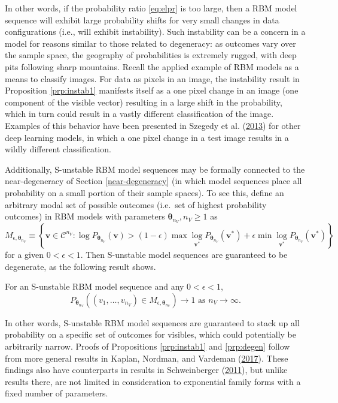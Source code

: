 \documentclass[]{article}
\theoremstyle{definition}
\newcommand{\nv}{{n_{\scriptscriptstyle V}}}
\let\BeginKnitrBlock\begin \let\EndKnitrBlock\end
\begin{document}
In other words, if the probability ratio \eqref{eq:elpr} is too large,
then a RBM model sequence will exhibit large probability shifts for very
small changes in data configurations (i.e., will exhibit instability).
Such instability can be a concern in a model for reasons similar to
those related to degeneracy: as outcomes vary over the sample space, the
geography of probabilities is extremely rugged, with deep pits following
sharp mountains. Recall the applied example of RBM models as a means to
classify images. For data as pixels in an image, the instability result
in Proposition \ref{prp:instab1} manifests itself as a one pixel change
in an image (one component of the visible vector) resulting in a large
shift in the probability, which in turn could result in a vastly
different classification of the image. Examples of this behavior have
been presented in Szegedy et al.
(\protect\hyperlink{ref-szegedy2013intriguing}{2013}) for other deep
learning models, in which a one pixel change in a test image results in
a wildly different classification.

Additionally, S-unstable RBM model sequences may be formally connected
to the near-degeneracy of Section \ref{near-degeneracy} (in which model
sequences place all probability on a small portion of their sample
spaces). To see this, define an arbitrary modal set of possible outcomes
(i.e.~set of highest probability outcomes) in RBM models with parameters
\(\boldsymbol \theta_\nv, \nv \ge 1\) as \[
M_{\epsilon, \boldsymbol \theta_\nv} \equiv \left\{\boldsymbol v \in \mathcal{C}^\nv: \log P_{\boldsymbol \theta_\nv}(\boldsymbol v) > (1-\epsilon)\max\log\limits_{\boldsymbol v^*}P_{\boldsymbol \theta_\nv}(\boldsymbol v^*) + \epsilon\min\log\limits_{\boldsymbol v^*}P_{\boldsymbol \theta_\nv}(\boldsymbol v^*) \right\}
\] for a given \(0 < \epsilon < 1\). Then S-unstable model sequences are
guaranteed to be degenerate, as the following result shows.

\BeginKnitrBlock{proposition}
\protect\hypertarget{prp:degen}{}{\label{prp:degen}}For an S-unstable RBM
model sequence and any \(0 < \epsilon < 1\), \[
P_{\boldsymbol \theta_\nv}\left((v_1, \dots, v_\nv) \in M_{\epsilon, \boldsymbol \theta_\nv}\right) \rightarrow 1 \text{ as } \nv \rightarrow \infty.
\]
\EndKnitrBlock{proposition}

In other words, S-unstable RBM model sequences are guaranteed to stack
up all probability on a specific set of outcomes for visibles, which
could potentially be arbitrarily narrow. Proofs of Propositions
\ref{prp:instab1} and \ref{prp:degen} follow from more general results
in Kaplan, Nordman, and Vardeman
(\protect\hyperlink{ref-kaplan2016propriety}{2017}). These findings also
have counterparts in results in Schweinberger
(\protect\hyperlink{ref-schweinberger2011instability}{2011}), but unlike
results there, are not limited in consideration to exponential family
forms with a fixed number of parameters.
\end{document}
